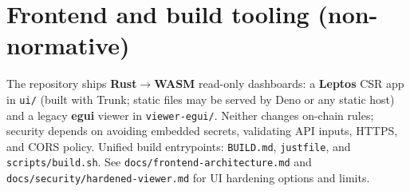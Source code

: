 \documentclass[11pt,a4paper]{article}
\begin{document}
\section{Frontend and build tooling (non-normative)}

The repository ships \textbf{Rust$\to$WASM} read-only dashboards: a \textbf{Leptos} CSR app in \texttt{ui/} (built with Trunk; static files may be served by Deno or any static host) and a legacy \textbf{egui} viewer in \texttt{viewer-egui/}. Neither changes on-chain rules; security depends on avoiding embedded secrets, validating API inputs, HTTPS, and CORS policy. Unified build entrypoints: \texttt{BUILD.md}, \texttt{justfile}, and \texttt{scripts/build.sh}. See \texttt{docs/frontend-architecture.md} and \texttt{docs/security/hardened-viewer.md} for UI hardening options and limits.
\end{document}
